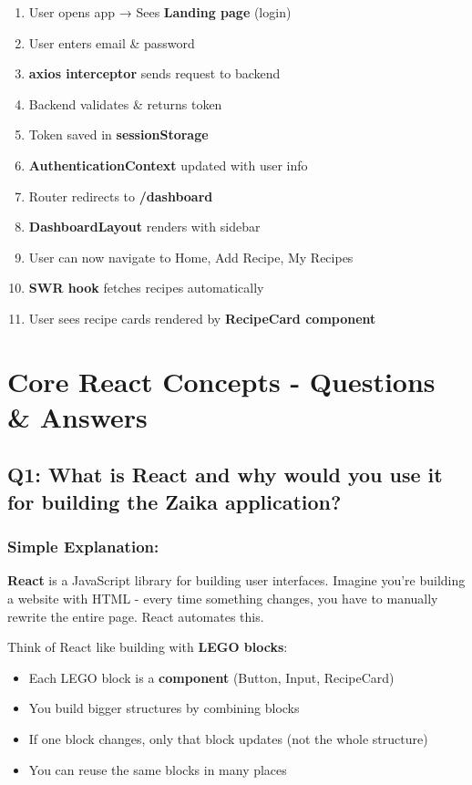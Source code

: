 \documentclass[12pt]{article}
\begin{document}
\begin{enumerate}
    \item User opens app → Sees \textbf{Landing page} (login)
    \item User enters email \& password
    \item \textbf{axios interceptor} sends request to backend
    \item Backend validates \& returns token
    \item Token saved in \textbf{sessionStorage}
    \item \textbf{AuthenticationContext} updated with user info
    \item Router redirects to \textbf{/dashboard}
    \item \textbf{DashboardLayout} renders with sidebar
    \item User can now navigate to Home, Add Recipe, My Recipes
    \item \textbf{SWR hook} fetches recipes automatically
    \item User sees recipe cards rendered by \textbf{RecipeCard component}
\end{enumerate}

\section{Core React Concepts - Questions \& Answers}

\subsection{Q1: What is React and why would you use it for building the Zaika application?}

\subsubsection*{Simple Explanation:}

\textbf{React} is a JavaScript library for building user interfaces. Imagine you're building a website with HTML - every time something changes, you have to manually rewrite the entire page. React automates this.

Think of React like building with \textbf{LEGO blocks}:
\begin{itemize}
    \item Each LEGO block is a \textbf{component} (Button, Input, RecipeCard)
    \item You build bigger structures by combining blocks
    \item If one block changes, only that block updates (not the whole structure)
    \item You can reuse the same blocks in many places
\end{itemize}
\end{document}
